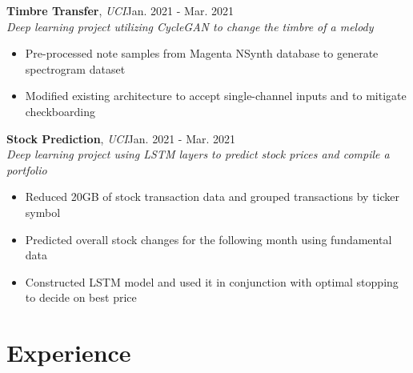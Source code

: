 \documentclass[12pt]{article}
\newcommand\firstboxx[2]{\textbf{\fontsize{12.8}{15}\selectfont #1}, \textit{#2}}
\newcommand{\itemheader}[3]{\firstboxx{#1}{#2}\hfill#3}
\begin{document}
\bigskip
\itemheader{Timbre Transfer}{UCI}{Jan. 2021 - Mar. 2021}
\\ \textit{Deep learning project utilizing CycleGAN to change the timbre of a melody}
\begin{itemize}
\item Pre-processed note samples from Magenta NSynth database to generate spectrogram dataset
\item Modified existing architecture to accept single-channel inputs and to mitigate checkboarding
\end{itemize}

\bigskip
\itemheader{Stock Prediction}{UCI}{Jan. 2021 - Mar. 2021}
\\ \textit{Deep learning project using LSTM layers to predict stock prices and compile a portfolio}
\begin{itemize}
\item Reduced 20GB of stock transaction data and grouped transactions by ticker symbol
\item Predicted overall stock changes for the following month using fundamental data
\item Constructed LSTM model and used it in conjunction with optimal stopping to decide on best price
\end{itemize}


\section*{Experience}
\vspace*{-1em}\makebox[\linewidth]{\rule{\textwidth}{0.4pt}}
\end{document}
